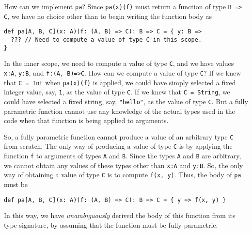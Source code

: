 How can we implement \lstinline!pa!?
Since \lstinline!pa(x)(f)!
must return a function of type \lstinline!B => C!,
we have no choice other than to begin writing the function body as
\begin{lstlisting}
def pa[A, B, C](x: A)(f: (A, B) => C): B => C = { y: B =>
  ??? // Need to compute a value of type C in this scope.
}
\end{lstlisting}
In the inner scope, we need to compute a value of type \lstinline!C!,
and we have values \lstinline!x:A!,
\lstinline!y:B!, and \lstinline!f:(A, B)=>C!.
How can we compute a value of type \lstinline!C!?
If we knew that \lstinline!C = Int!
when \lstinline!pa(x)(f)!
is applied, we could have simply selected a fixed integer value, say,
\lstinline!1!, as the value
of type \lstinline!C!.
If we knew that \lstinline!C = String!,
we could have selected a fixed string, say, \lstinline!"hello"!,
as the value of type \lstinline!C!.
But a fully parametric function cannot use any knowledge of the actual
types used in the code when that function is being applied to arguments.

So, a fully parametric function cannot produce a value of an arbitrary
type \lstinline!C! from
scratch. The only way of producing a value of type \lstinline!C!
is by applying the function \lstinline!f!
to arguments of types \lstinline!A!
and \lstinline!B!. Since
the types \lstinline!A!
and \lstinline!B! are arbitrary,
we cannot obtain any values of these types other than \lstinline!x:A!
and \lstinline!y:B!. So,
the only way of obtaining a value of type \lstinline!C!
is to compute \lstinline!f(x, y)!.
Thus, the body of \lstinline!pa!
must be
\begin{lstlisting}
def pa[A, B, C](x: A)(f: (A, B) => C): B => C = { y => f(x, y) }
\end{lstlisting}
In this way, we have \emph{unambiguously} derived the body of this
function from its type signature, by assuming that the function must
be fully parametric.

